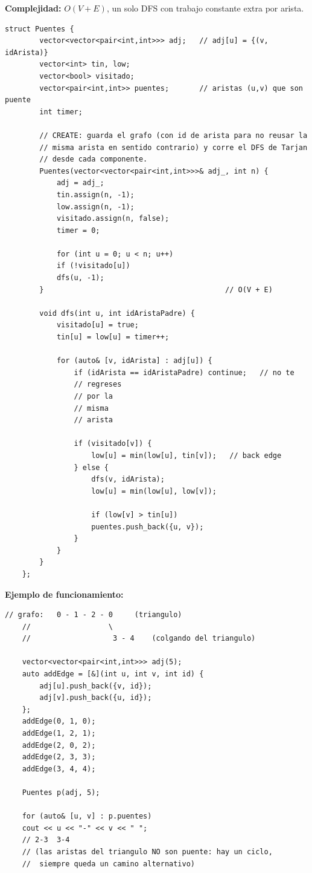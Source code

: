 \documentclass[10pt,a4paper,twocolumn]{article}
\begin{document}
\textbf{Complejidad:} $O(V + E)$, un solo DFS con trabajo constante
extra por arista.

\begin{lstlisting}[style=cpp]
	struct Puentes {
		vector<vector<pair<int,int>>> adj;   // adj[u] = {(v, idArista)}
		vector<int> tin, low;
		vector<bool> visitado;
		vector<pair<int,int>> puentes;       // aristas (u,v) que son puente
		int timer;
		
		// CREATE: guarda el grafo (con id de arista para no reusar la
		// misma arista en sentido contrario) y corre el DFS de Tarjan
		// desde cada componente.
		Puentes(vector<vector<pair<int,int>>>& adj_, int n) {
			adj = adj_;
			tin.assign(n, -1);
			low.assign(n, -1);
			visitado.assign(n, false);
			timer = 0;
			
			for (int u = 0; u < n; u++)
			if (!visitado[u])
			dfs(u, -1);
		}                                          // O(V + E)
		
		void dfs(int u, int idAristaPadre) {
			visitado[u] = true;
			tin[u] = low[u] = timer++;
			
			for (auto& [v, idArista] : adj[u]) {
				if (idArista == idAristaPadre) continue;   // no te
				// regreses
				// por la
				// misma
				// arista
				
				if (visitado[v]) {
					low[u] = min(low[u], tin[v]);   // back edge
				} else {
					dfs(v, idArista);
					low[u] = min(low[u], low[v]);
					
					if (low[v] > tin[u])
					puentes.push_back({u, v});
				}
			}
		}
	};
\end{lstlisting}

\textbf{Ejemplo de funcionamiento:}

\begin{lstlisting}[style=cpp]
	// grafo:   0 - 1 - 2 - 0     (triangulo)
	//                  \
	//                   3 - 4    (colgando del triangulo)
	
	vector<vector<pair<int,int>>> adj(5);
	auto addEdge = [&](int u, int v, int id) {
		adj[u].push_back({v, id});
		adj[v].push_back({u, id});
	};
	addEdge(0, 1, 0);
	addEdge(1, 2, 1);
	addEdge(2, 0, 2);
	addEdge(2, 3, 3);
	addEdge(3, 4, 4);
	
	Puentes p(adj, 5);
	
	for (auto& [u, v] : p.puentes)
	cout << u << "-" << v << " ";
	// 2-3  3-4
	// (las aristas del triangulo NO son puente: hay un ciclo,
	//  siempre queda un camino alternativo)
\end{lstlisting}
\end{document}
